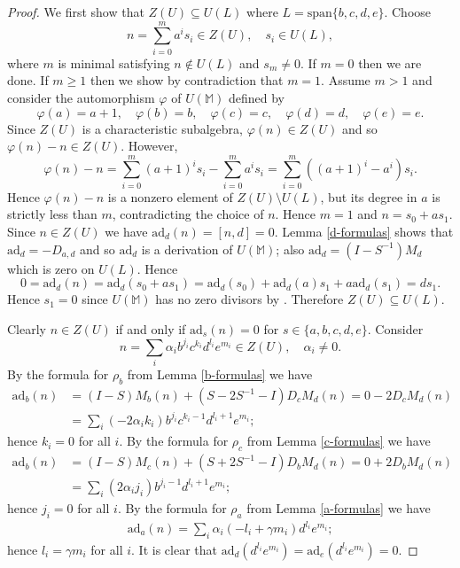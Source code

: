 \documentclass{amsart}
\theoremstyle{plain}
\theoremstyle{definition}
\begin{document}
\begin{proof}
We first show that $Z(U) \subseteq U(L)$ where $L = \text{span}\{ b, c, d, e
\}$. Choose
  \[
  n = \sum_{i=0}^m a^i s_i \in Z(U),
  \quad
  s_i \in U(L),
  \]
where $m$ is minimal satisfying $n \notin U(L)$ and $s_m \ne 0$. If $m = 0$
then we are done. If $m \ge 1$ then we show by contradiction that $m = 1$.
Assume $m > 1$ and consider the automorphism $\varphi$ of $U(\mathbb{M})$
defined by
  \[
  \varphi(a) = a+1, \quad
  \varphi(b) = b, \quad
  \varphi(c) = c, \quad
  \varphi(d) = d, \quad
  \varphi(e) = e.
  \]
Since $Z(U)$ is a characteristic subalgebra, $\varphi(n) \in Z(U)$ and so
$\varphi(n) - n \in Z(U)$. However,
  \[
  \varphi(n)-n
  =
  \sum_{i=0}^m (a+1)^i s_i - \sum_{i=0}^m a^i s_i
  =
  \sum_{i=0}^m ( (a+1)^i - a^i ) s_i.
  \]
Hence $\varphi(n) - n$ is a nonzero element of $Z(U) \setminus U(L)$, but its
degree in $a$ is strictly less than $m$, contradicting the choice of $n$. Hence
$m = 1$ and $n = s_0 + a s_1$. Since $n \in Z(U)$ we have $\mathrm{ad}_d(n) =
[n,d] = 0$. Lemma \ref{d-formulas} shows that $\mathrm{ad}_d = - D_{a,d}$ and
so $\mathrm{ad}_d$ is a derivation of $U(\mathbb{M})$; also $\mathrm{ad}_d = (
I - S^{-1} ) M_d$ which is zero on $U(L)$. Hence
  \[
  0
  =
  \mathrm{ad}_d (n)
  =
  \mathrm{ad}_d (s_0 + a s_1)
  =
  \mathrm{ad}_d(s_0) + \mathrm{ad}_d(a) s_1 + a \mathrm{ad}_d(s_1)
  =
  d s_1.
  \]
Hence $s_1 = 0$ since $U(\mathbb{M})$ has no zero divisors by
\cite{PerezIzquierdoShestakov}. Therefore $Z(U) \subseteq U(L)$.

Clearly $n \in Z(U)$ if and only if $\mathrm{ad}_s(n) = 0$ for $s \in \{ a, b,
c, d, e \}$. Consider
  \[
  n
  =
  \sum_i \alpha_i b^{j_i} c^{k_i} d^{l_i} e^{m_i}
  \in
  Z(U),
  \quad
  \alpha_i \ne 0.
  \]
By the formula for $\rho_b$ from Lemma \ref{b-formulas} we have
  \allowdisplaybreaks
  \begin{align*}
  \mathrm{ad}_b (n)
  &=
  (I - S) M_b (n)
  +
  (S - 2 S^{-1} - I) D_c M_d (n)
  =
  0 - 2 D_c M_d (n)
  \\
  &=
  \sum_i ( -2 \alpha_i k_i ) b^{j_i} c^{k_i-1} d^{l_i+1} e^{m_i};
  \end{align*}
hence $k_i = 0$ for all $i$. By the formula for $\rho_c$ from Lemma
\ref{c-formulas} we have
  \allowdisplaybreaks
  \begin{align*}
  \mathrm{ad}_b (n)
  &=
  (I - S) M_c (n)
  +
  (S + 2 S^{-1} - I) D_b M_d (n)
  =
  0 + 2 D_b M_d (n)
  \\
  &=
  \sum_i ( 2 \alpha_i j_i ) b^{j_i-1} d^{l_i+1} e^{m_i};
  \end{align*}
hence $j_i = 0$ for all $i$. By the formula for $\rho_a$ from Lemma
\ref{a-formulas} we have
  \allowdisplaybreaks
  \begin{align*}
  \mathrm{ad}_a(n)
  =
  \sum_i \alpha_i ( - l_i {+} \gamma m_i ) d^{l_i} e^{m_i};
  \end{align*}
hence $l_i = \gamma m_i $ for all $i$. It is clear that $\mathrm{ad}_d (
d^{l_i} e^{m_i} ) = \mathrm{ad}_e (d^{l_i} e^{m_i}) = 0$.


\end{proof}
\end{document}
